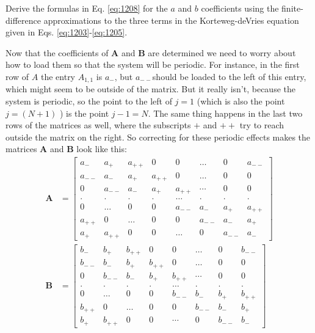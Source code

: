 \begin{problem}\label{P12.1}
Derive the formulas in Eq. \eqref{eq:1208} for the $a$ and $b$ coefficients using the finite-difference approximations to the three terms in the Korteweg-deVries equation given in Eqs. \eqref{eq:1203}-\eqref{eq:1205}.
\end{problem}
Now that the coefficients of $\mathbf{A}$ and $\mathbf{B}$ are determined we need to worry about how to load them so that the system will be periodic. For instance, in the first row of $A$ the entry $A_{1,1}$ is $a_{-}$, but $a_{--}$should be loaded to the left of this entry, which might seem to be outside of the matrix. But it really isn\rq t, because the system is periodic, so the point to the left of $j=1$ (which is also the point $j=(N+1)$ ) is the point $j-1=N$. The same thing happens in the last two rows of the matrices as well, where the subscripts $+$ and $++$ try to reach outside the matrix on the right. So correcting for these periodic effects makes the matrices $\mathbf{A}$ and $\mathbf{B}$ look like this:
\begin{equation}\label{eq:1209}
\begin{aligned}
\mathbf{A} &=\left[\begin{array}{cccccccc}
a_{-} & a_{+} & a_{++} & 0 & 0 & \ldots & 0 & a_{--} \\
a_{--} & a_{-} & a_{+} & a_{++} & 0 & \ldots & 0 & 0 \\
0 & a_{--} & a_{-} & a_{+} & a_{++} & \cdots & 0 & 0 \\
. & . & . & . & \ldots & . & . & . \\
0 & \ldots & 0 & 0 & a_{--} & a_{-} & a_{+} & a_{++} \\
a_{++} & 0 & \ldots & 0 & 0 & a_{--} & a_{-} & a_{+} \\
a_{+} & a_{++} & 0 & 0 & \ldots & 0 & a_{--} & a_{-}
\end{array}\right] \\
\mathbf{B} &=\left[\begin{array}{cccccccc}
b_{-} & b_{+} & b_{++} & 0 & 0 & \ldots & 0 & b_{--} \\
b_{--} & b_{-} & b_{+} & b_{++} & 0 & \ldots & 0 & 0 \\
0 & b_{--} & b_{-} & b_{+} & b_{++} & \cdots & 0 & 0 \\
. & . & . & . & \ldots & . & . & . \\
0 & \ldots & 0 & 0 & b_{--} & b_{-} & b_{+} & b_{++} \\
b_{++} & 0 & \ldots & 0 & 0 & b_{--} & b_{-} & b_{+} \\
b_{+} & b_{++} & 0 & 0 & \cdots & 0 & b_{--} & b_{-}
\end{array}\right]
\end{aligned}
\end{equation}

